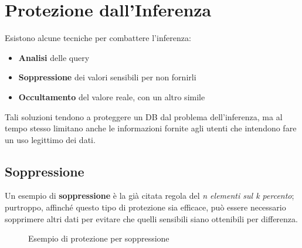 \section{Protezione dall'Inferenza}
Esistono alcune tecniche per combattere l'inferenza:
\begin{itemize}
\item \textbf{Analisi} delle query
\item \textbf{Soppressione} dei valori sensibili per non fornirli
\item \textbf{Occultamento} del valore reale, con un altro simile
\end{itemize}
Tali soluzioni tendono a proteggere un DB dal problema dell'inferenza, ma al tempo stesso limitano anche le
informazioni fornite agli utenti che intendono fare un uso legittimo dei dati.
\subsection{Soppressione}
Un esempio di \textbf{soppressione} è la già citata regola del \textit{n elementi sul k percento}; purtroppo, affinché questo tipo di protezione sia efficace, può essere necessario sopprimere altri dati per evitare che quelli sensibili siano ottenibili per differenza.

\begin{figure}[htpb]
	\centering
		
				
		\caption{Esempio di protezione per soppressione
		  \label{fig:query_soppressione}}  

\end{figure}


